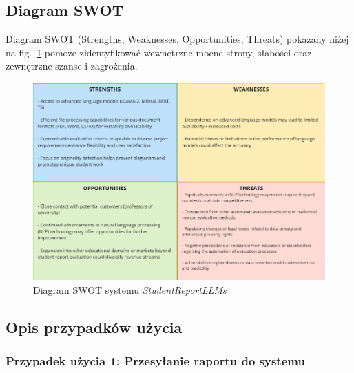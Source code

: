 \documentclass[a4paper, 12pt]{article}
\begin{document}
\subsection{Diagram SWOT}
Diagram SWOT (Strengths, Weaknesses, Opportunities, Threats) pokazany niżej na fig.~\ref{fig:swot} pomoże zidentyfikować wewnętrzne mocne strony, słabości oraz zewnętrzne szanse i zagrożenia.

\begin{figure}[H]
    \centering
    \includegraphics[width=\textwidth]{img/swot}
    \caption{Diagram SWOT systemu \textit{StudentReportLLMs}}
    \label{fig:swot}
\end{figure}

\subsection{Opis przypadków użycia}

\subsubsection{Przypadek użycia 1: Przesyłanie raportu do systemu}
\end{document}
